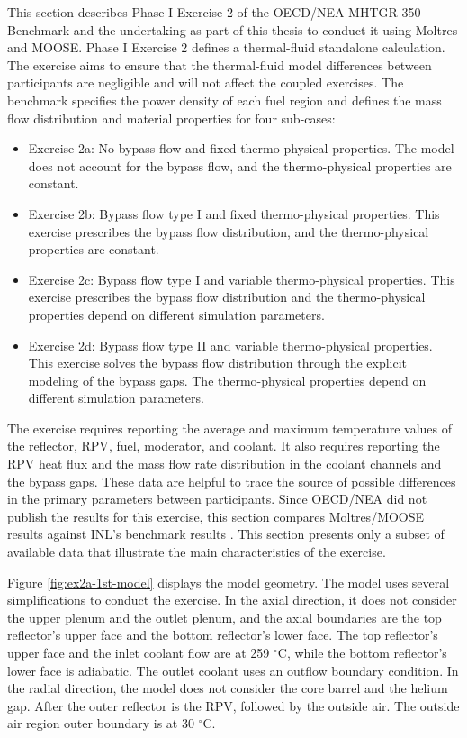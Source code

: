 This section describes Phase I Exercise 2 of the OECD/NEA MHTGR-350 Benchmark \cite{oecd_nea_benchmark_2017} and the undertaking as part of this thesis to conduct it using Moltres and MOOSE.
Phase I Exercise 2 defines a thermal-fluid standalone calculation.
The exercise aims to ensure that the thermal-fluid model differences between participants are negligible and will not affect the coupled exercises.
The benchmark specifies the power density of each fuel region and defines the mass flow distribution and material properties for four sub-cases:
\begin{itemize}
  \item Exercise 2a: No bypass flow and fixed thermo-physical properties. The model does not account for the bypass flow, and the thermo-physical properties are constant.
  \item Exercise 2b: Bypass flow type I and fixed thermo-physical properties. This exercise prescribes the bypass flow distribution, and the thermo-physical properties are constant.
  \item Exercise 2c: Bypass flow type I and variable thermo-physical properties. This exercise prescribes the bypass flow distribution and the thermo-physical properties depend on different simulation parameters.
  \item Exercise 2d: Bypass flow type II and variable thermo-physical properties. This exercise solves the bypass flow distribution through the explicit modeling of the bypass gaps. The thermo-physical properties depend on different simulation parameters.
\end{itemize}

The exercise requires reporting the average and maximum temperature values of the reflector, \gls{RPV}, fuel, moderator, and coolant.
It also requires reporting the RPV heat flux and the mass flow rate distribution in the coolant channels and the bypass gaps.
These data are helpful to trace the source of possible differences in the primary parameters between participants.
Since OECD/NEA did not publish the results for this exercise, this section compares Moltres/MOOSE results against INL's benchmark results \cite{strydom_inl_2013}.
This section presents only a subset of available data that illustrate the main characteristics of the exercise.

Figure \ref{fig:ex2a-1st-model} displays the model geometry.
The model uses several simplifications to conduct the exercise.
In the axial direction, it does not consider the upper plenum and the outlet plenum, and the axial boundaries are the top reflector's upper face and the bottom reflector's lower face.
The top reflector's upper face and the inlet coolant flow are at 259 $^{\circ}$C, while the bottom reflector's lower face is adiabatic.
The outlet coolant uses an outflow boundary condition.
In the radial direction, the model does not consider the core barrel and the helium gap.
After the outer reflector is the RPV, followed by the outside air.
The outside air region outer boundary is at 30 $^{\circ}$C.

